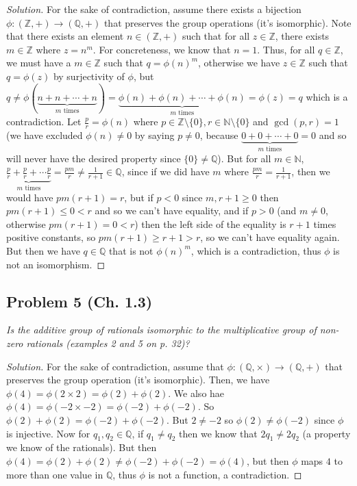 \documentclass{article}
\newcommand{\N}{{\mathbb N}}
\newcommand{\Z}{{\mathbb Z}}
\newcommand{\Q}{{\mathbb Q}}
\begin{document}
\begin{proof}[Solution]\let\qed\relax
	For the sake of contradiction,
	assume there exists a bijection $\phi \colon (\Z,+) \to (\Q,+)$
	that preserves the group operations (it's isomorphic).
	Note that there exists an element $n \in (\Z,+)$ such that
	for all $z \in \Z$, there exists $m \in \Z$ where $z = n^{m}$.
	For concreteness, we know that $n = 1$.
	Thus, for all $q \in \Z$, we must have a $m \in \Z$ such that $q = \phi(n)^m$,
	otherwise we have $z \in \Z$ such that $q = \phi(z)$ by surjectivity of $\phi$,
	but $q \neq \phi(\underbrace{n + n + \cdots + n}_{m\text{ times}})
	= \underbrace{\phi(n) + \phi(n) + \cdots + \phi(n)}_{m\text{ times}} = \phi(z) = q$
	which is a contradiction.
	Let $\frac{p}{r} = \phi(n)$ where $p \in \Z\setminus\{0\}, r \in \N\setminus\{0\}$
	and $\gcd(p,r) = 1$
	(we have excluded $\phi(n) \neq 0$ by saying $p \neq 0$,
	because $\underbrace{0 + 0 + \cdots + 0}_{m\text{ times}} = 0$
	and so will never have the desired property
	since $\{0\}\neq\Q$).
	But for all $m \in \N$, $\underbrace{\frac{p}{r} + \frac{p}{r} +
	\cdots \frac{p}{r}}_{m\text{ times}} = \frac{pm}{r} \neq \frac{1}{r+1} \in \Q$,
	since if we did have $m$ where $\frac{pm}{r} = \frac{1}{r+1}$,
	then we would have $pm(r+1) = r$,
	but if $p < 0$ since $m,r+1 \geq 0$ then $pm(r+1) \leq 0 < r$ and so we can't have equality,
	and if $p > 0$ (and $m\neq 0$, otherwise $pm(r+1) = 0 < r$)
	then the left side of the equality is $r+1$ times positive constants,
	so $pm(r+1) \geq r+1 > r$, so we can't have equality again.
	But then we have $q \in \Q$ that is not $\phi(n)^m$,
	which is a contradiction,
	thus $\phi$ is not an isomorphism.
\end{proof}

\subsection*{Problem 5 (Ch. 1.3)}
{\it Is the additive group of rationals isomorphic to the multiplicative group
of non-zero rationals (examples 2 and 5 on p. 32)?}

\begin{proof}[Solution]\let\qed\relax
	For the sake of contradiction, assume that $\phi \colon (\Q,\times) \to (\Q, +)$
	that preserves the group operation (it's isomorphic).
	Then, we have $\phi(4) = \phi(2\times2) = \phi(2) + \phi(2)$.
	We also hae $\phi(4) = \phi(-2\times-2) = \phi(-2) + \phi(-2)$.
	So $\phi(2) + \phi(2) = \phi(-2) + \phi(-2)$.
	But $2 \neq -2$ so $\phi(2) \neq \phi(-2)$ since $\phi$ is injective.
	Now for $q_1, q_2 \in \Q$,
	if $q_1 \neq q_2$ then we know that $2q_1 \neq 2q_2$
	(a property we know of the rationals).
	But then $\phi(4) = \phi(2) + \phi(2) \neq \phi(-2) + \phi(-2) = \phi(4)$,
	but then $\phi$ maps $4$ to more than one value in $\Q$,
	thus $\phi$ is not a function, a contradiction.
\end{proof}
\end{document}
